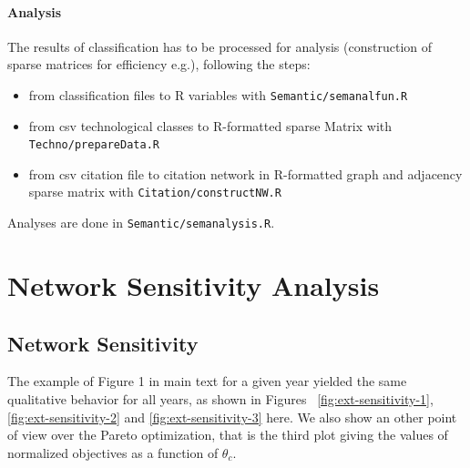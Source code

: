 \documentclass[article]{article}%
\begin{document}
\paragraph{Analysis}

The results of classification has to be processed for analysis (construction of sparse matrices for efficiency e.g.), following the steps:
\begin{itemize}
\item from classification files to R variables with \texttt{Semantic/semanalfun.R}
\item from csv technological classes to R-formatted sparse Matrix with \texttt{Techno/prepareData.R} 
\item from csv citation file to citation network in R-formatted graph and adjacency sparse matrix with \texttt{Citation/constructNW.R}
\end{itemize}

Analyses are done in \texttt{Semantic/semanalysis.R}.


\section{Network Sensitivity Analysis \label{app:sensitivity}}


\subsection{Network Sensitivity}

The example of Figure 1 in main text for a given year yielded the same qualitative behavior for all years, as shown in Figures ~\ref{fig:ext-sensitivity-1}, \ref{fig:ext-sensitivity-2} and \ref{fig:ext-sensitivity-3} here.  We also show an other point of view over the Pareto optimization, that is the third plot giving the values of normalized objectives as a function of $\theta_c$.

\end{document}
